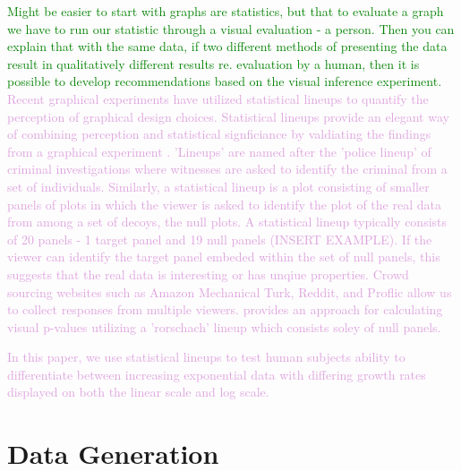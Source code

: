 \documentclass[]{interact}
\theoremstyle{plain}%
\theoremstyle{definition}
\theoremstyle{remark}
\begin{document}
\textcolor{Green}{Might be easier to start with graphs are statistics, but that to evaluate a graph we have to run our statistic through a visual evaluation - a person. Then you can explain that with the same data, if two different methods of presenting the data result in qualitatively different results re. evaluation by a human, then it is possible to develop recommendations based on the visual inference experiment.}
\textcolor{Plum}{Recent graphical experiments have utilized statistical lineups to quantify the perception of graphical design choices\citep{vanderplas_clusters_2017}. 
Statistical lineups provide an elegant way of combining perception and statistical signficiance by valdiating the findings from a graphical experiment \citep{buja_statistical_2009, wickham2010graphical, hofmann_graphical_2012, majumder_validation_2013, vanderplas_clusters_2017}.
'Lineups' are named after the 'police lineup' of criminal investigations where witnesses are asked to identify the criminal from a set of individuals. 
Similarly, a statistical lineup is a plot consisting of smaller panels of plots in which the viewer is asked to identify the plot of the real data from among a set of decoys, the null plots. 
A statistical lineup typically consists of 20 panels - 1 target panel and 19 null panels (INSERT EXAMPLE). 
If the viewer can identify the target panel embeded within the set of null panels, this suggests that the real data is interesting or has unqiue properties.
Crowd sourcing websites such as Amazon Mechanical Turk, Reddit, and Proflic allow us to collect responses from multiple viewers.
\cite{vanderplas_statistical_nodate} provides an approach for calculating visual p-values utilizing a 'rorschach' lineup which consists soley of null panels.
}

\textcolor{Plum}{
In this paper, we use statistical lineups to test human subjects ability to differentiate between increasing exponential data with differing growth rates displayed on both the linear scale and log scale.
}

\hypertarget{data-generation}{%
\section{Data Generation}\label{data-generation}}
\end{document}
